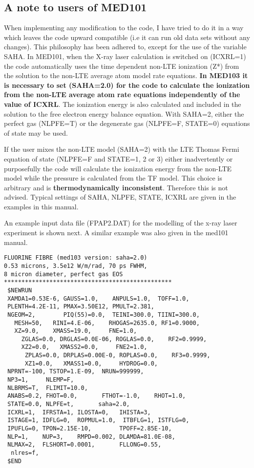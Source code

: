 \subsection{ A note  to users of MED101}
When implementing any modification to the code, I have tried to do it
in a way which leaves the code upward compatible (i.e it can
run old data sets without any changes). This philosophy has been
adhered to, except for the use of the variable SAHA. In MED101,
when the X-ray laser calculation is switched on (ICXRL=1) the code
automatically uses the time dependent non-LTE ionization (Z*) from the solution
to the non-LTE average atom model rate equations. {\bf In MED103 it is
necessary to set (SAHA=2.0) for the code to calculate the ionization
from the non-LTE average atom rate equations independently of  the value of ICXRL}.
The ionization energy is  also calculated and included in the solution
to the free electron energy balance equation.
With SAHA=2,   either the perfect
gas (NLPFE=T) or the degenerate gas (NLPFE=F, STATE=0) equations of state
may be used.

If the user mixes the non-LTE model (SAHA=2) with the LTE
Thomas Fermi equation of state
(NLPFE=F and STATE=1, 2 or 3) either inadvertently or purposefully
the code will calculate the ionization
energy from the non-LTE model while the pressure is calculated from the TF model.
This choice is arbitrary and is {\bf thermodynamically inconsistent}. Therefore this is not advised.
Typical settings of SAHA, NLPFE, STATE, ICXRL are given in the examples
in this manual.
                                                            
An example input data file  (FPAP2.DAT) for the modelling of the
x-ray laser experiment is shown next. A similar example  was also given in the med101
manual\cite{med101}.
\begin{verbatim}
FLUORINE FIBRE (med103 version: saha=2.0)
0.53 microns, 3.5e12 W/m/rad, 70 ps FWHM,
8 micron diameter, perfect gas EOS
************************************************
 $NEWRUN
 XAMDA1=0.53E-6, GAUSS=1.0,    ANPULS=1.0,  TOFF=1.0,
 PLENTH=4.2E-11, PMAX=3.50E12, PMULT=2.381,
 NGEOM=2,        PIQ(55)=0.0,  TEINI=300.0, TIINI=300.0,
   MESH=50,   RINI=4.E-06,    RHOGAS=2635.0, RF1=0.9000,
   XZ=9.0,    XMASS=19.0,     FNE=1.0,
     ZGLAS=0.0, DRGLAS=0.0E-06, ROGLAS=0.0,    RF2=0.9999,
     XZ2=0.0,   XMASS2=0.0,     FNE2=1.0,
      ZPLAS=0.0, DRPLAS=0.00E-0, ROPLAS=0.0,    RF3=0.9999,
      XZ1=0.0,   XMASS1=0.0,     HYDROG=0.0,
 NPRNT=-100, TSTOP=1.E-09,  NRUN=999999,
 NP3=1,     NLEMP=F,
 NLBRMS=T,  FLIMIT=10.0,
 ANABS=0.2, FHOT=0.0,       FTHOT=-1.0,    RHOT=1.0,
 STATE=0.0, NLPFE=t,       saha=2.0,
 ICXRL=1,  IFRSTA=1, ILOSTA=0,   IHISTA=3,
 ISTAGE=1, IDFLG=0,  ROPMUL=1.0,  ITBFLG=1, ISTFLG=0,
 IPUFLG=0, TPON=2.15E-10,        TPOFF=2.85E-10,
 NLP=1,    NUP=3,    RMPD=0.002, DLAMDA=81.0E-08,
 NLMAX=2,  FLSHORT=0.0001,       FLLONG=0.55,
  nlres=f,
 $END
\end{verbatim}


